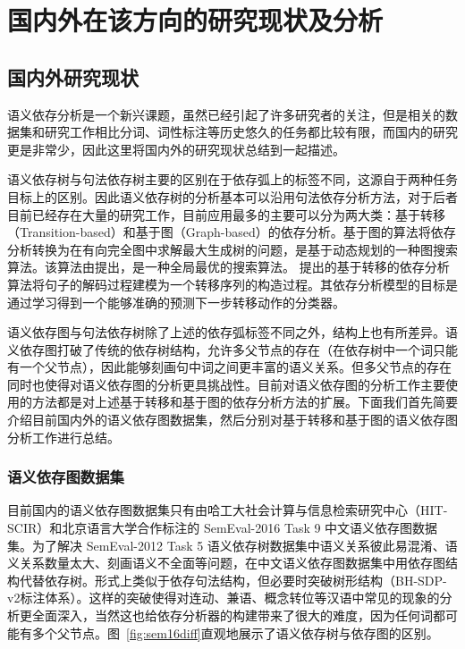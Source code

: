 
\section{国内外在该方向的研究现状及分析}
\subsection{国内外研究现状}

语义依存分析是一个新兴课题，虽然已经引起了许多研究者的关注，但是相关的数据集和研究工作相比分词、词性标注等历史悠久的任务都比较有限，而国内的研究更是非常少，因此这里将国内外的研究现状总结到一起描述。

语义依存树与句法依存树主要的区别在于依存弧上的标签不同，这源自于两种任务目标上的区别。因此语义依存树的分析基本可以沿用句法依存分析方法，对于后者目前已经存在大量的研究工作，目前应用最多的主要可以分为两大类：基于转移（Transition-based）和基于图（Graph-based）的依存分析。基于图的算法将依存分析转换为在有向完全图中求解最大生成树的问题，是基于动态规划的一种图搜索算法。该算法由提出，是一种全局最优的搜索算法。 提出的基于转移的依存分析算法将句子的解码过程建模为一个转移序列的构造过程。其依存分析模型的目标是通过学习得到一个能够准确的预测下一步转移动作的分类器。

语义依存图与句法依存树除了上述的依存弧标签不同之外，结构上也有所差异。语义依存图打破了传统的依存树结构，允许多父节点的存在（在依存树中一个词只能有一个父节点），因此能够刻画句中词之间更丰富的语义关系。但多父节点的存在同时也使得对语义依存图的分析更具挑战性。目前对语义依存图的分析工作主要使用的方法都是对上述基于转移和基于图的依存分析方法的扩展。下面我们首先简要介绍目前国内外的语义依存图数据集，然后分别对基于转移和基于图的语义依存图分析工作进行总结。

\subsubsection{语义依存图数据集}

目前国内的语义依存图数据集只有由哈工大社会计算与信息检索研究中心（HIT-SCIR）和北京语言大学合作标注的 SemEval-2016 Task 9 中文语义依存图数据集\cite{che-EtAl:2016:SemEval}。为了解决 SemEval-2012 Task 5 语义依存树数据集\cite{che-EtAl:2012:STARSEM-SEMEVAL}中语义关系彼此易混淆、语义关系数量太大、刻画语义不全面等问题，在中文语义依存图数据集中用依存图结构代替依存树。形式上类似于依存句法结构，但必要时突破树形结构（BH-SDP-v2标注体系）。这样的突破使得对连动、兼语、概念转位等汉语中常见的现象的分析更全面深入，当然这也给依存分析器的构建带来了很大的难度，因为任何词都可能有多个父节点。图~\ref{fig:sem16diff}直观地展示了语义依存树与依存图的区别。

